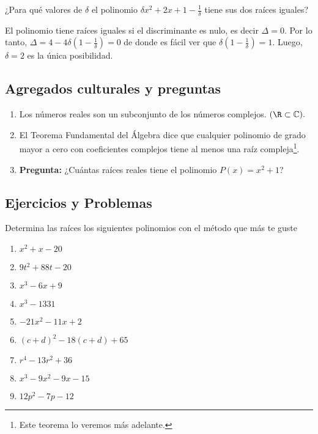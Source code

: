 \begin{section-example.tcb}
    ¿Para qué valores de $\delta$ el polinomio $\delta x^2 + 2x + 1 - \frac{1}{\delta}$ tiene sus dos raíces iguales?
\end{section-example.tcb}
\begin{solution}
    El polinomio tiene raíces iguales si el discriminante es nulo, es decir $\Delta = 0$.
    Por lo tanto, $\Delta = 4 - 4\delta (1 - \frac{1}{\delta}) = 0$ de donde es fácil ver que $\delta (1 - \frac{1}{\delta}) = 1$.
    Luego, $\delta = 2$ es la única posibilidad.
\end{solution}


\subsection{Agregados culturales y preguntas}

\begin{enumerate}
    \item Los números reales son un subconjunto de los números complejos. $(\R \subset \mathbb{C}).$
    \item El Teorema Fundamental del Álgebra dice que cualquier polinomio de grado mayor a cero con coeficientes complejos tiene al menos una raíz compleja\footnote{Este teorema lo veremos más adelante.}.
    \item \textbf{Pregunta:} ¿Cuántas raíces reales tiene el polinomio $P(x) = x^2+1$?
\end{enumerate}



\subsection{Ejercicios y Problemas}

\begin{section-exercise}
    Determina las raíces los siguientes polinomios con el método que más te guste
    \begin{multicols}{3}
        \begin{enumerate}
            \item $x^2 + x - 20$
            \item $9t^2 + 88t - 20$
            \item $x^3 - 6x + 9$
            \item $x^3 - 1331$
            \item $-21x^2 - 11x + 2$
            \item $(c + d)^2 - 18(c + d) + 65$
            \item $r^4 - 13r^2 + 36$
            \item $x^3 - 9x^2 - 9x - 15$
            \item $12p^2 - 7p - 12$
        \end{enumerate}
    \end{multicols}
\end{section-exercise}

